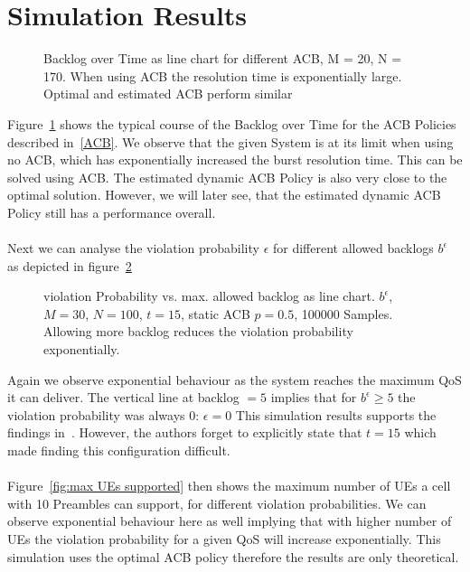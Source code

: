 \documentclass[conference]{IEEEtran}
\begin{document}
\section{Simulation Results}
\begin{figure}
\resizebox{\columnwidth}{!}{}
    \caption{Backlog over Time as line chart for different ACB, M = 20, N = 170. When using ACB the resolution time is exponentially large. Optimal and estimated ACB perform similar}\label{fig:backlog}
\end{figure}
Figure~\ref{fig:backlog} shows the typical course of the Backlog over Time for the ACB Policies described in~\ref{ACB}.
We observe that the given System is at its limit when using no ACB, which has exponentially increased the burst resolution time.
This can be solved using ACB. The estimated dynamic ACB Policy is also very close to the optimal solution.
However, we will later see, that the estimated dynamic ACB Policy still has a performance overall.\\\\
Next we can analyse the violation probability $\epsilon$ for different allowed backlogs $b^\epsilon$ as depicted in figure~\ref{fig:violation prob}
\begin{figure}
\resizebox{\columnwidth}{!}{}
    \caption{violation Probability vs. max. allowed backlog as line chart. $b^\epsilon$,  $M = 30$, $N = 100$, $t = 15$, static ACB $p=0.5$, 100000 Samples.\\Allowing more backlog reduces the violation probability exponentially.}\label{fig:violation prob}
\end{figure}
Again we observe exponential behaviour as the system reaches the maximum QoS it can deliver.
The vertical line at backlog $= 5$ implies that for $b^\epsilon\geq 5$ the violation probability was always 0: $\epsilon = 0$
This simulation results supports the findings in~\cite{8422323}.
However, the authors forget to explicitly state that $t = 15$ which made finding this configuration difficult.\\\\
Figure~\ref{fig:max UEs supported} then shows the maximum number of UEs a cell with 10 Preambles can support, for different violation probabilities.
We can observe exponential behaviour here as well implying that with higher number of UEs the violation probability for a given QoS will increase exponentially.
This simulation uses the optimal ACB policy therefore the results are only theoretical.\\\\
\end{document}
